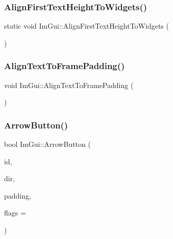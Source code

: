 \hypertarget{namespace_im_gui_a0c1fd13ae89c240fb7547e244d672f9b}{}\label{namespace_im_gui_a0c1fd13ae89c240fb7547e244d672f9b} 
\subsubsection{\texorpdfstring{Align\+First\+Text\+Height\+To\+Widgets()}{AlignFirstTextHeightToWidgets()}}
{\footnotesize\ttfamily static void Im\+Gui\+::\+Align\+First\+Text\+Height\+To\+Widgets (\begin{DoxyParamCaption}{ }\end{DoxyParamCaption})\hspace{0.3cm}{\ttfamily [static]}}

\hypertarget{namespace_im_gui_ae14be3a3bec106de7c91aaa2a9a558a1}{}\label{namespace_im_gui_ae14be3a3bec106de7c91aaa2a9a558a1} 
\subsubsection{\texorpdfstring{Align\+Text\+To\+Frame\+Padding()}{AlignTextToFramePadding()}}
{\footnotesize\ttfamily void Im\+Gui\+::\+Align\+Text\+To\+Frame\+Padding (\begin{DoxyParamCaption}{ }\end{DoxyParamCaption})}

\hypertarget{namespace_im_gui_ac7c2bd67d2bb2d8ee4b583b1576a0bd3}{}\label{namespace_im_gui_ac7c2bd67d2bb2d8ee4b583b1576a0bd3} 
\subsubsection{\texorpdfstring{Arrow\+Button()}{ArrowButton()}}
{\footnotesize\ttfamily bool Im\+Gui\+::\+Arrow\+Button (\begin{DoxyParamCaption}\item[{Im\+Gui\+ID}]{id,  }\item[{Im\+Gui\+Dir}]{dir,  }\item[{\hyperlink{struct_im_vec2}{Im\+Vec2}}]{padding,  }\item[{Im\+Gui\+Button\+Flags}]{flags = {} }\end{DoxyParamCaption})}

